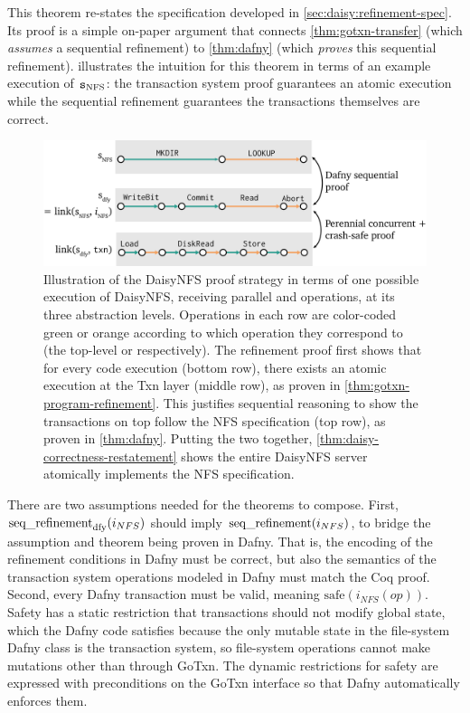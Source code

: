 This theorem re-states the specification developed in
\cref{sec:daisy:refinement-spec}. Its proof is a simple on-paper argument that
connects \cref{thm:gotxn-transfer} (which \emph{assumes} a sequential
refinement) to \cref{thm:dafny} (which \emph{proves} this sequential refinement).
 illustrates
the intuition for this theorem in terms of an example execution of $\texttt{s}_{\mathrm{NFS}}$: the transaction system proof guarantees an
atomic execution while the sequential refinement guarantees the transactions
themselves are correct.

\begin{figure}
  \centering
  \includegraphics{fig/refinement-execs.png}
  \caption[Overall DaisyNFS proof strategy]{Illustration of the DaisyNFS proof
    strategy in terms of one
    possible execution of DaisyNFS, receiving parallel  and 
    operations, at its three abstraction levels. Operations in each row are
    color-coded green or orange according to which operation they correspond to
    (the top-level  or  respectively). The refinement proof first
    shows that for every code execution (bottom row), there exists an atomic
    execution at the Txn layer (middle row), as proven in
    \cref{thm:gotxn-program-refinement}. This justifies sequential reasoning to
    show the transactions on top follow the NFS specification (top row), as
    proven in \cref{thm:dafny}. Putting the two together,
    \cref{thm:daisy-correctness-restatement} shows the entire DaisyNFS server atomically
    implements the NFS specification.}
  \label{fig:refinement-execs}
\end{figure}

There are two assumptions needed for the theorems to compose. First,
$\operatorname{seq\_refinement}_{\mathrm{dfy}}(i_{NFS})$ should imply $\operatorname{seq\_refinement}(i_{NFS})$,
to bridge the assumption and theorem being proven in Dafny. That is, the
encoding of the refinement conditions in Dafny must be correct, but also the
semantics of the transaction system operations modeled in Dafny must match the
Coq proof. Second, every Dafny transaction must be valid, meaning
$\mathrm{safe}(i_{NFS}(op))$. Safety has a static restriction that transactions
should not modify global state, which the Dafny code satisfies because the only
mutable state in the file-system Dafny class is the transaction system, so
file-system operations cannot make mutations other than through GoTxn. The
dynamic restrictions for safety are expressed with preconditions on the GoTxn
interface so that Dafny automatically enforces them.

